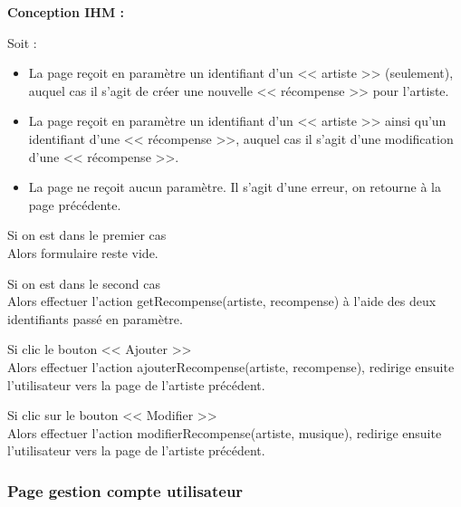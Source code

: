 			\begin{paragraphe}
				\textbf{Conception IHM :}
			\end{paragraphe}

			\begin{paragraphe}
				Soit :
				\begin{itemize}
					\item La page reçoit en paramètre un identifiant d'un << artiste >> (seulement), auquel cas il s'agit de créer une nouvelle << récompense >> pour l'artiste.
					\item La page reçoit en paramètre un identifiant d'un << artiste >> ainsi qu'un identifiant d'une << récompense >>, auquel cas il s'agit d'une modification d'une << récompense >>.
					\item La page ne reçoit aucun paramètre. Il s'agit d'une erreur, on retourne à la page précédente.
				\end{itemize}
			\end{paragraphe}


			\begin{paragraphe}
				Si on est dans le premier cas \\
				Alors formulaire reste vide.
			\end{paragraphe}

			\begin{paragraphe}
				Si on est dans le second cas \\
				Alors effectuer l'action getRecompense(artiste, recompense) à l'aide des deux identifiants passé en paramètre.
			\end{paragraphe}

			\begin{paragraphe}
				Si clic le bouton << Ajouter >> \\
				Alors effectuer l'action ajouterRecompense(artiste, recompense), redirige ensuite l'utilisateur vers la page de l'artiste précédent.
			\end{paragraphe}

			\begin{paragraphe}
				Si clic sur le bouton << Modifier >> \\
				Alors effectuer l'action modifierRecompense(artiste, musique), redirige ensuite l'utilisateur vers la page de l'artiste précédent.
			\end{paragraphe}

		\subsubsection{Page gestion compte utilisateur}

